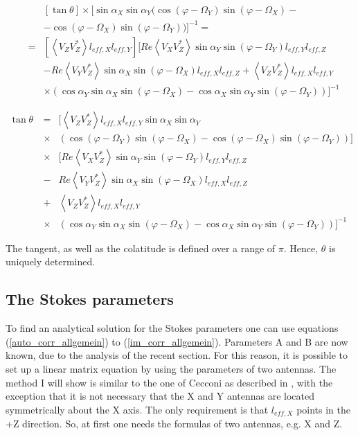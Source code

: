 \documentclass[a4paper,11pt]{report}
\begin{document}
\begin{eqnarray}
&&\left[ \tan \theta \right]  \times [ \sin \alpha_X  \sin \alpha_Y ( \cos (\varphi - \Omega_Y)  \sin (\varphi - \Omega_X)-\nonumber \\
&&-\cos (\varphi - \Omega_X)  \sin (\varphi - \Omega_Y))]^{-1} = \nonumber \\
&=& [\left\langle V_Z V_Z^{*} \right\rangle l_{eff,X} l_{eff,Y}]  [Re \left\langle V_X V_Z^{*}\right\rangle \sin \alpha_Y  \sin (\varphi - \Omega_Y) l_{eff,Y}l_{eff,Z}\nonumber \\
&&-Re\left\langle V_Y V_Z^{*}\right\rangle\sin \alpha_X  \sin (\varphi - \Omega_X) l_{eff,X}l_{eff,Z} +\left\langle V_Z V_Z^{*} \right\rangle l_{eff,X} l_{eff,Y} \nonumber \\
&&\times(\cos \alpha_Y \sin \alpha_X  \sin (\varphi - \Omega_X)-\cos \alpha_X  \sin \alpha_Y  \sin (\varphi - \Omega_Y))]^{-1}
\end{eqnarray}

\begin{eqnarray}\label{tan_theta}
\tan \theta\  &=&
[\left\langle V_Z V_Z^{*} \right\rangle l_{eff,X} l_{eff,Y} \sin \alpha_X  \sin \alpha_Y \\
&\times&( \cos (\varphi - \Omega_Y)  \sin (\varphi - \Omega_X) -\cos (\varphi - \Omega_X)  \sin (\varphi - \Omega_Y))]\nonumber \\
&\times& [Re \left\langle V_X V_Z^{*}\right\rangle \sin \alpha_Y  \sin (\varphi - \Omega_Y) l_{eff,Y}l_{eff,Z} \nonumber \\
&-&Re\left\langle V_Y V_Z^{*}\right\rangle\sin \alpha_X  \sin (\varphi - \Omega_X) l_{eff,X}l_{eff,Z}\nonumber \\
&+&\left\langle V_Z V_Z^{*} \right\rangle l_{eff,X} l_{eff,Y} \nonumber \\
&\times&(\cos \alpha_Y \sin \alpha_X  \sin (\varphi - \Omega_X)-\cos \alpha_X  \sin \alpha_Y  \sin (\varphi - \Omega_Y))]^{-1} \nonumber
\end{eqnarray}

The tangent, as well as the colatitude is defined over a range of $\pi$. Hence, $\theta$ is uniquely determined.

\subsection{The Stokes parameters}

To find an analytical solution for the Stokes parameters one can use equations (\ref{auto_corr_allgemein}) to (\ref{im_corr_allgemein}). Parameters A and B are now known, due to the analysis of the recent section. For this reason, it is possible to set up a linear matrix equation by using the parameters of two antennas. The method I will show is similar to the one of Cecconi as described in \cite{cecconi04}, with the exception that it is not necessary that the X and Y antennas are located symmetrically about the X axis. The only requirement is that $l_{eff,X}$  points in the +Z direction. So, at first one needs the formulas of two antennas, e.g. X and Z.
\end{document}
